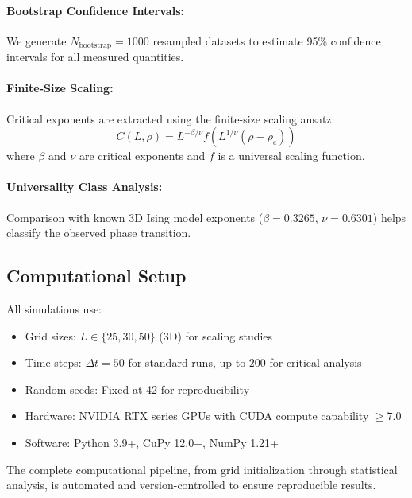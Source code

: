 \paragraph{Bootstrap Confidence Intervals:}
We generate $N_{\text{bootstrap}}=1000$ resampled datasets to estimate 95\% 
confidence intervals for all measured quantities.

\paragraph{Finite-Size Scaling:}
Critical exponents are extracted using the finite-size scaling ansatz:
\begin{equation}
C(L, \rho) = L^{-\beta/\nu} f\left(L^{1/\nu}(\rho - \rho_c)\right)
\label{eq:fss}
\end{equation}
where $\beta$ and $\nu$ are critical exponents and $f$ is a universal scaling function.

\paragraph{Universality Class Analysis:}
Comparison with known 3D Ising model exponents ($\beta = 0.3265$, $\nu = 0.6301$) 
helps classify the observed phase transition.

\subsection{Computational Setup}

All simulations use:
\begin{itemize}
\item Grid sizes: $L \in \{25, 30, 50\}$ (3D) for scaling studies
\item Time steps: $\Delta t = 50$ for standard runs, up to $200$ for critical analysis
\item Random seeds: Fixed at 42 for reproducibility
\item Hardware: NVIDIA RTX series GPUs with CUDA compute capability $\geq 7.0$
\item Software: Python 3.9+, CuPy 12.0+, NumPy 1.21+
\end{itemize}

The complete computational pipeline, from grid initialization through 
statistical analysis, is automated and version-controlled to ensure 
reproducible results.

